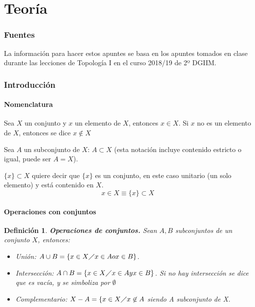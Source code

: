\documentclass[10pt, a4paper]{article}
\theoremstyle{theorem-style}
\theoremstyle{definition-style}
\newtheorem{ndef}{Definición}[section]
\theoremstyle{remark-style}
\theoremstyle{example-style}
\theoremstyle{definition-style}
\theoremstyle{remark-style}
\begin{document}

\thispagestyle{empty}
\tableofcontents
\newpage


\part{Teoría}

\section*{Fuentes}

La información para hacer estos apuntes se basa en los apuntes tomados en clase durante las lecciones de Topología I en el curso 2018/19 de 2º DGIIM.

\pagebreak

\section{Introducción}

\subsection{Nomenclatura}
Sea $X$ un conjunto y $x$ un elemento de $X$, entonces $x\in X$. Si $x$ no es un elemento de $X$, entonces se dice $x\not\in X$

Sea $A$ un subconjunto de $X$: $A\subset X$ (esta notación incluye contenido estricto o igual, puede ser $A=X$).

$\{x\}\subset X$ quiere decir que $\{x\}$ es un conjunto, en este caso unitario (un solo elemento) y está contenido en $X$.
$$x\in X \equiv \{x\}\subset X$$

\subsection{Operaciones con conjuntos}
\begin{ndef} \textbf{Operaciones de conjuntos.}
Sean $A,B$ subconjuntos de un conjunto $X$, entonces:
\begin{itemize}
\item Unión: $A\cup B=\{x\in X \diagup x\in A o x\in B\}$.
\item Intersección: $A\cap B=\{x\in X \diagup x\in A y x\in B\}$. Si no hay intersección se dice que es vacía, y se simboliza por $\emptyset$
\item Complementario: $X-A=\{x\in X\diagup x\not\in A$ siendo A subconjunto de X.
\end{itemize}
\end{ndef}
\end{document}
